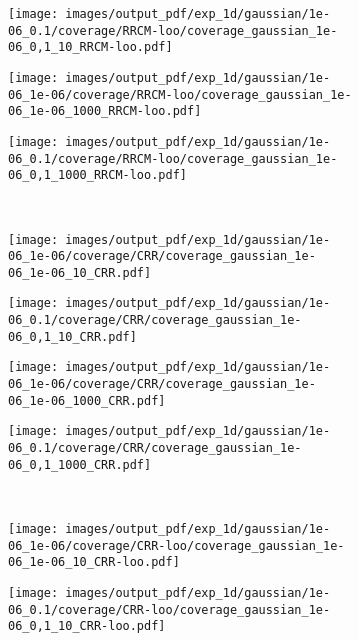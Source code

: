 \documentclass[a4paper,14pt]{extarticle}
\begin{document}
\begin{figure}
\begin{subfigure}[b]{0.25\linewidth}
  \end{subfigure}%
  \begin{subfigure}[b]{0.25\linewidth}
    \texttt{[image: images/output\_pdf/exp\_1d/gaussian/1e-06\_0.1/coverage/RRCM-loo/coverage\_gaussian\_1e-06\_0,1\_10\_RRCM-loo.pdf]}
  \end{subfigure}%
  \begin{subfigure}[b]{0.25\linewidth}
    \texttt{[image: images/output\_pdf/exp\_1d/gaussian/1e-06\_1e-06/coverage/RRCM-loo/coverage\_gaussian\_1e-06\_1e-06\_1000\_RRCM-loo.pdf]}
  \end{subfigure}%
  \begin{subfigure}[b]{0.25\linewidth}
    \texttt{[image: images/output\_pdf/exp\_1d/gaussian/1e-06\_0.1/coverage/RRCM-loo/coverage\_gaussian\_1e-06\_0,1\_1000\_RRCM-loo.pdf]}
  \end{subfigure}\\
  \begin{subfigure}[b]{0.25\linewidth}
    \texttt{[image: images/output\_pdf/exp\_1d/gaussian/1e-06\_1e-06/coverage/CRR/coverage\_gaussian\_1e-06\_1e-06\_10\_CRR.pdf]}
  \end{subfigure}%
  \begin{subfigure}[b]{0.25\linewidth}
    \texttt{[image: images/output\_pdf/exp\_1d/gaussian/1e-06\_0.1/coverage/CRR/coverage\_gaussian\_1e-06\_0,1\_10\_CRR.pdf]}
  \end{subfigure}%
  \begin{subfigure}[b]{0.25\linewidth}
    \texttt{[image: images/output\_pdf/exp\_1d/gaussian/1e-06\_1e-06/coverage/CRR/coverage\_gaussian\_1e-06\_1e-06\_1000\_CRR.pdf]}
  \end{subfigure}%
  \begin{subfigure}[b]{0.25\linewidth}
    \texttt{[image: images/output\_pdf/exp\_1d/gaussian/1e-06\_0.1/coverage/CRR/coverage\_gaussian\_1e-06\_0,1\_1000\_CRR.pdf]}
  \end{subfigure}\\
  \begin{subfigure}[b]{0.25\linewidth}
    \texttt{[image: images/output\_pdf/exp\_1d/gaussian/1e-06\_1e-06/coverage/CRR-loo/coverage\_gaussian\_1e-06\_1e-06\_10\_CRR-loo.pdf]}
  \end{subfigure}%
  \begin{subfigure}[b]{0.25\linewidth}
    \texttt{[image: images/output\_pdf/exp\_1d/gaussian/1e-06\_0.1/coverage/CRR-loo/coverage\_gaussian\_1e-06\_0,1\_10\_CRR-loo.pdf]}

\end{subfigure}
\end{figure}
\end{document}
